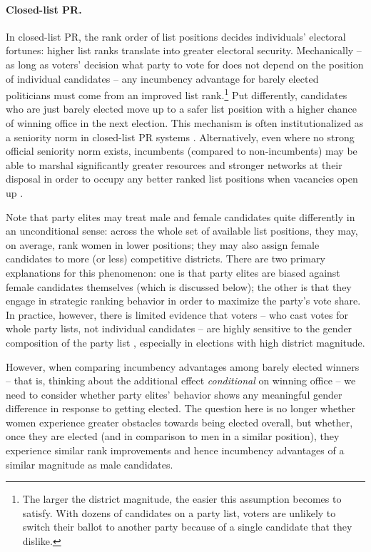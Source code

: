\documentclass[12pt]{article}
\begin{document}
\paragraph*{Closed-list PR.} In closed-list PR, the rank order of list positions decides individuals' electoral fortunes: higher list ranks translate into greater electoral security. Mechanically -- as long as voters' decision what party to vote for does not depend on the position of individual candidates -- any incumbency advantage for barely elected politicians must come from an improved list rank.\footnote{The larger the district magnitude, the easier this assumption becomes to satisfy. With dozens of candidates on a party list, voters are unlikely to switch their ballot to another party because of a single candidate that they dislike.} Put differently, candidates who are just barely elected move up to a safer list position with a higher chance of winning office in the next election. This mechanism is often institutionalized as a seniority norm in closed-list PR systems \citep[cf.][]{cirone2020}. Alternatively, even where no strong official seniority norm exists, incumbents (compared to non-incumbents) may be able to marshal significantly greater resources and stronger networks at their disposal in order to occupy any better ranked list positions when vacancies open up \citep{trounstine2010modern,nunez2018clientelistic}.

Note that party elites may treat male and female candidates quite differently in an unconditional sense: across the whole set of available list positions, they may, on average, rank women in lower positions; they may also assign female candidates to more (or less) competitive districts. There are two primary explanations for this phenomenon: one is that party elites are biased against female candidates themselves (which is discussed below); the other is that they engage in strategic ranking behavior in order to maximize the party's vote share. In practice, however, there is limited evidence that voters -- who cast votes for whole party lists, not individual candidates -- are highly sensitive to the gender composition of the party list \citep{bagues2020a}, especially in elections with high district magnitude.

However, when comparing incumbency advantages among barely elected winners -- that is, thinking about the additional effect \emph{conditional} on winning office -- we need to consider whether party elites' behavior shows any meaningful gender difference in response to getting elected. The question here is no longer whether women experience greater obstacles towards being elected overall, but whether, once they are elected (and in comparison to men in a similar position), they experience similar rank improvements and hence incumbency advantages of a similar magnitude as male candidates.
\end{document}
